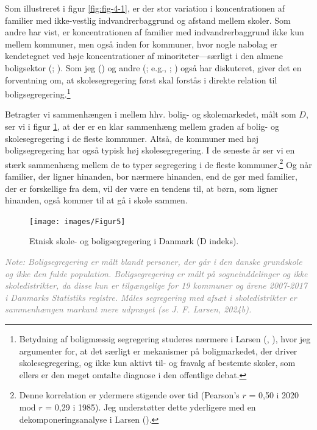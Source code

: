 \documentclass[
]{book}
\begin{document}
Som illustreret i figur \ref{fig:fig-4-1}, er der stor variation i koncentrationen af familier med ikke-vestlig indvandrerbaggrund og afstand mellem skoler. Som andre har vist, er koncentrationen af familier med indvandrerbaggrund ikke kun mellem kommuner, men også inden for kommuner, hvor nogle nabolag er kendetegnet ved høje koncentrationer af minoriteter---særligt i den almene boligsektor (; ). Som jeg () og andre (; e.g., ; ) også har diskuteret, giver det en forventning om, at skolesegregering først skal forstås i direkte relation til boligsegregering.\footnote{Betydning af boligmæssig segregering studeres nærmere i Larsen (, ), hvor jeg argumenter for, at det særligt er mekanismer på boligmarkedet, der driver skolesegregering, og ikke kun aktivt til- og fravalg af bestemte skoler, som ellers er den meget omtalte diagnose i den offentlige debat.}

Betragter vi sammenhængen i mellem hhv. bolig- og skolemarkedet, målt som \(D\), ser vi i figur \ref{fig:fig-4-4}, at der er en klar sammenhæng mellem graden af bolig- og skolesegregering i de fleste kommuner. Altså, de kommuner med høj boligsegregering har også typisk høj skolesegregering. I de seneste år ser vi en stærk sammenhæng mellem de to typer segregering i de fleste kommuner.\footnote{Denne korrelation er ydermere stigende over tid (Pearson's \(r\) = 0,50 i 2020 mod \(r\) = 0,29 i 1985). Jeg understøtter dette yderligere med en dekomponeringsanalyse i Larsen ().} Og når familier, der ligner hinanden, bor nærmere hinanden, end de gør med familier, der er forskellige fra dem, vil der være en tendens til, at børn, som ligner hinanden, også kommer til at gå i skole sammen.

\newpage

\begin{figure}
\texttt{[image: images/Figur5]} \caption{Etnisk skole- og boligsegregering i Danmark (D indeks).}\label{fig:fig-4-4}
\end{figure}

\begin{footnotesize}\textit{\textcolor{gray}{
Note: Boligsegregering er målt blandt personer, der går i den danske grundskole og ikke den fulde population. Boligsegregering er målt på sogneinddelinger og ikke skoledistrikter, da disse kun er tilgængelige for 19 kommuner og årene 2007-2017 i Danmarks Statistiks registre. Måles segregering med afsæt i skoledistrikter er sammenhængen markant mere udpræget (se J. F. Larsen, 2024b).
}}
\end{footnotesize}
\end{document}
